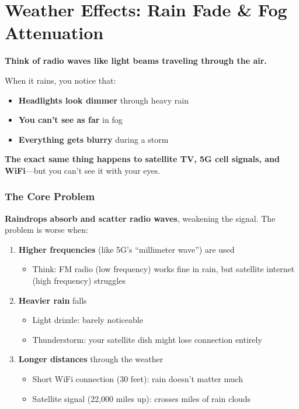 \chapter{Weather Effects: Rain Fade \& Fog Attenuation}
\label{ch:weather-effects}

\begin{nontechnical}
\textbf{Think of radio waves like light beams traveling through the air.}

When it rains, you notice that:
\begin{itemize}
\item \textbf{Headlights look dimmer} through heavy rain
\item \textbf{You can't see as far} in fog
\item \textbf{Everything gets blurry} during a storm
\end{itemize}

\textbf{The exact same thing happens to satellite TV, 5G cell signals, and WiFi}---but you can't see it with your eyes.

\subsection*{The Core Problem}

\textbf{Raindrops absorb and scatter radio waves}, weakening the signal. The problem is worse when:

\begin{enumerate}
\item \textbf{Higher frequencies} (like 5G's ``millimeter wave'') are used
  \begin{itemize}
  \item Think: FM radio (low frequency) works fine in rain, but satellite internet (high frequency) struggles
  \end{itemize}
\item \textbf{Heavier rain} falls
  \begin{itemize}
  \item Light drizzle: barely noticeable
  \item Thunderstorm: your satellite dish might lose connection entirely
  \end{itemize}
\item \textbf{Longer distances} through the weather
  \begin{itemize}
  \item Short WiFi connection (30 feet): rain doesn't matter much
  \item Satellite signal (22,000 miles up): crosses miles of rain clouds
  \end{itemize}
\end{enumerate}


\end{nontechnical}
